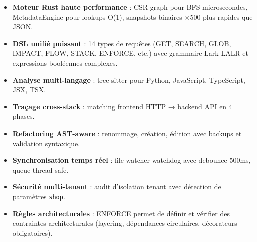 \documentclass[12pt,a4paper]{article}
\newcommand{\code}[1]{\texttt{#1}}
\begin{document}
\begin{itemize}
    \item \textbf{Moteur Rust haute performance} : CSR graph pour BFS microsecondes, MetadataEngine pour lookups O(1), snapshots binaires ×500 plus rapides que JSON.
    \item \textbf{DSL unifié puissant} : 14 types de requêtes (GET, SEARCH, GLOB, IMPACT, FLOW, STACK, ENFORCE, etc.) avec grammaire Lark LALR et expressions booléennes complexes.
    \item \textbf{Analyse multi-langage} : tree-sitter pour Python, JavaScript, TypeScript, JSX, TSX.
    \item \textbf{Traçage cross-stack} : matching frontend HTTP → backend API en 4 phases.
    \item \textbf{Refactoring AST-aware} : renommage, création, édition avec backups et validation syntaxique.
    \item \textbf{Synchronisation temps réel} : file watcher watchdog avec debounce 500ms, queue thread-safe.
    \item \textbf{Sécurité multi-tenant} : audit d'isolation tenant avec détection de paramètres \code{shop}.
    \item \textbf{Règles architecturales} : ENFORCE permet de définir et vérifier des contraintes architecturales (layering, dépendances circulaires, décorateurs obligatoires).
\end{itemize}
\end{document}
